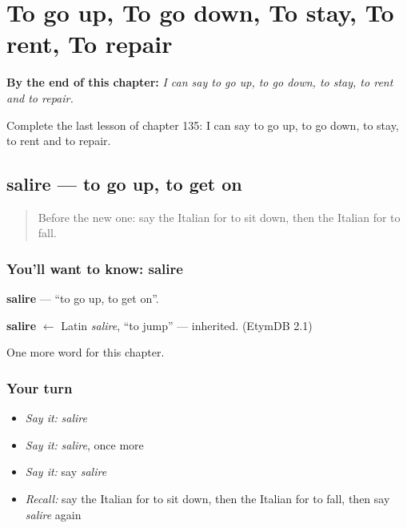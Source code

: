 
\chapter{To go up, To go down, To stay, To rent, To repair}
\label{ch:it-to-go-up-to-go-down-to-stay-to-rent-to-repair}

\begin{chapteropening}
\textbf{By the end of this chapter:} \emph{I can say to go up, to go down, to stay, to rent and to repair.}

Complete the last lesson of chapter 135: I can say to go up, to go down, to stay, to rent and to repair.
\end{chapteropening}

\section[salire]{salire — to go up, to get on}

\label{lesson:IT-C135-salire}



\begin{quote}
Before the new one: say the Italian for to sit down, then the Italian for to fall.
\end{quote}

\subsection*{You'll want to know: salire}
\textbf{salire} — \textquotedblleft{}to go up, to get on\textquotedblright{}.

\begin{cousinweb}
\textbf{salire} $\leftarrow$ Latin \emph{salire}, \textquotedblleft{}to jump\textquotedblright{} — inherited. (EtymDB 2.1)
\end{cousinweb}

\begin{grammarlens}[title={What you've built}]
One more word for this chapter.
\end{grammarlens}

\subsection*{Your turn}
\begin{itemize}
\raggedright
  \item \emph{Say it:} \emph{salire}
  \item \emph{Say it:} \emph{salire}, once more
  \item \emph{Say it:} say \emph{salire}
  \item \emph{Recall:} say the Italian for to sit down, then the Italian for to fall, then say \emph{salire} again
\end{itemize}

